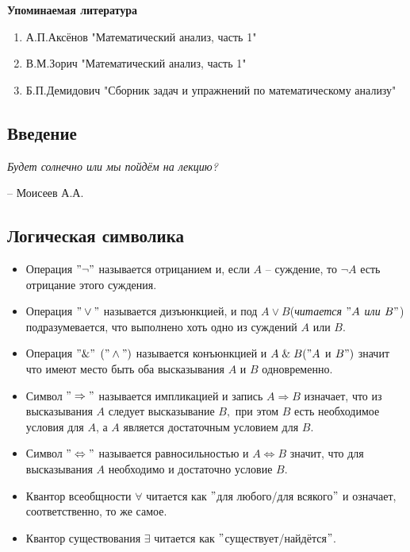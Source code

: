 \pagestyle{plain}
\begin{center}
\large \bf Упоминаемая литература
\end{center}

\smallskip

\begin{enumerate}
\item А.П.Аксёнов "Математический анализ, часть 1"
\item В.М.Зорич "Математический анализ, часть 1"
\item Б.П.Демидович "Сборник задач и упражнений по математическому анализу"
\end{enumerate}

\newpage 
\begin{center}

\smallskip
\smallskip
\smallskip
\smallskip

\section{\LARGE{\bf Введение}}


\end{center}

\epigraph{\textit{Будет солнечно или мы пойдём на лекцию?}}
{-- Моисеев А.А.}

\subsection{Логическая символика}

\begin{itemize}
\item Операция $"\neg"$ называется отрицанием и, если $A$ -- суждение, то $\neg A$ есть отрицание этого суждения.
\item Операция $"\vee"$ называется дизъюнкцией, и под $A \vee B$(\textit{читается $"A$ или $B"$}) подразумевается, что выполнено хоть одно из суждений $A$ или $B.$

\item Операция $"\&"$ $("\wedge")$ называется конъюнкцией и $A\;\&\;B("A$ и $B")$ значит что имеют место быть оба высказывания $A$ и $B$ одновременно.

\item Символ $"\Rightarrow"$ называется импликацией и запись $A \Rightarrow B$ изначает, что из высказывания $A$ следует высказывание $B,$ при этом $B$ есть необходимое условия для $A$, а $A$ является достаточным условием для $B.$

\item Символ $"\Leftrightarrow"$ называется равносильностью и $A \Leftrightarrow B$ значит, что для высказывания $A$ необходимо и достаточно условие $B.$

\item Квантор всеобщности $\forall$ читается как $"$для любого/для всякого$"$ и означает, соответственно, то же самое.

\item Квантор существования $\exists$ читается как $"$существует/найдётся$"$.
\end{itemize}

